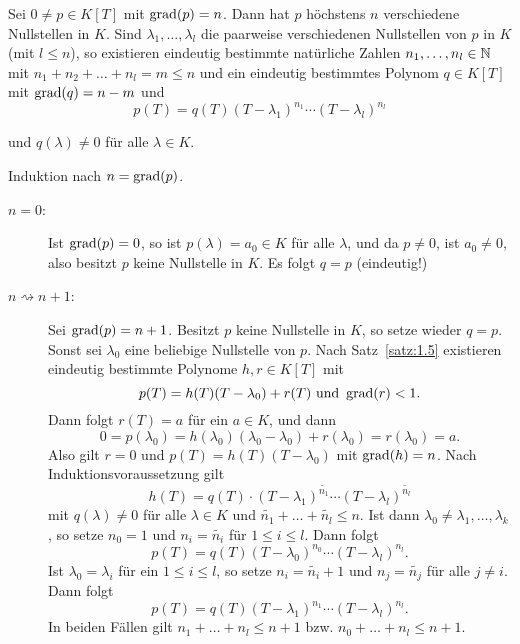 \begin{satz}
	\label{satz:1.6}
	Sei $0 \neq p \in K[T]$ mit $\operatorname{grad}(p) = n$.
	Dann hat $p$ höchstens $n$ verschiedene Nullstellen in $K$.
	Sind $\lambda_1,\dots,\lambda_l$ die paarweise verschiedenen Nullstellen von $p$ in $K$ (mit $l \leq n$), so existieren eindeutig bestimmte natürliche Zahlen $n_1,\dots,n_l \in \mathbb{N}$ mit $n_1+n_2+\dots+n_l = m \leq n$ und ein eindeutig bestimmtes Polynom $q \in K[T]$ mit $\operatorname{grad}(q) = n-m$ und
	\begin{equation}
		p(T) = q(T)(T-\lambda_1)^{n_1} \cdots (T-\lambda_l)^{n_l} \label{eq:1.6.1}
	\end{equation}
		
	und $q(\lambda) \neq 0$ für alle $\lambda \in K$.
\end{satz}

\begin{beweis}
	Induktion nach $n = \operatorname{grad}(p)$.
	\begin{description}
		\item[$n=0$:] Ist $\operatorname{grad}(p) = 0$, so ist $p(\lambda) = a_0 \in K$ für alle $\lambda$, und da $p \neq 0$, ist $a_0 \neq 0$, also besitzt $p$ keine Nullstelle in $K$.
		Es folgt $q = p$ (eindeutig!)
		\item[$n \rightsquigarrow n+1$:] Sei $\operatorname{grad}(p) = n+1$.
		Besitzt $p$ keine Nullstelle in $K$, so setze wieder $q = p$.
		Sonst sei $\lambda_0$ eine beliebige Nullstelle von $p$.
		Nach Satz~\ref{satz:1.5} existieren eindeutig bestimmte Polynome $h,r \in K[T]$ mit 
		\[
			p(T) = h(T)(T-\lambda_0) + r(T) \text{ und } \operatorname{grad}(r) < 1.
		\]
		Dann folgt $r(T) = a$ für ein $a \in K$, und dann
		\[
			0 = p(\lambda_0) = h(\lambda_0)(\lambda_0-\lambda_0) + r(\lambda_0) = r(\lambda_0) = a.
		\]
		Also gilt $r = 0$ und $p(T) = h(T)(T-\lambda_0)$ mit $\operatorname{grad}(h) = n$.
		Nach Induktionsvoraussetzung gilt
		\[
			h(T) = q(T)\cdot (T-\lambda_1)^{\widetilde{n_1}} \cdots (T-\lambda_l)^{\widetilde{n_l}}
		\]
		mit $q(\lambda) \neq 0$ für alle $\lambda \in K$ und $\widetilde{n_1} + \dots + \widetilde{n_l} \leq n$.
		Ist dann $\lambda_0 \neq \lambda_1,\dots,\lambda_k$, so setze $n_0 = 1$ und $n_i = \widetilde{n_i}$ für $1 \leq i \leq l$.
		Dann folgt
		\[
			p(T) = q(T)(T-\lambda_0)^{n_0} \cdots (T-\lambda_l)^{n_l}.
		\]
		Ist $\lambda_0 = \lambda_i$ für ein $1 \leq i \leq l$, so setze $n_i = \widetilde{n_i} + 1$ und $n_j = \widetilde{n_j}$ für alle $j \neq i$.
		Dann folgt
		\[
			p(T) = q(T)(T-\lambda_1)^{n_1} \cdots (T-\lambda_l)^{n_l}.
		\]
		In beiden Fällen gilt $n_1+\dots+n_l \leq n+1$ bzw. $n_0 + \dots + n_l \leq n+1$.
		

\end{description}
\end{beweis}
